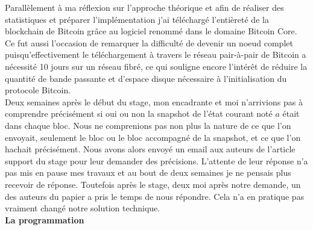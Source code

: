 \documentclass[12pt,a4paper]{article}
\begin{document}
	Parallèlement à ma réflexion sur l'approche théorique et afin de réaliser des statistiques et préparer l'implémentation j'ai téléchargé l'entièreté de la blockchain de Bitcoin grâce au logiciel renommé dans le domaine Bitcoin Core. Ce fut aussi l'occasion de remarquer la difficulté de devenir un noeud complet puisqu'effectivement le téléchargement à travers le réseau pair-à-pair de Bitcoin a nécessité 10 jours sur un réseau fibré, ce qui souligne encore l'intérêt de réduire la quantité de bande passante et d'espace disque nécessaire à l'initialisation du protocole Bitcoin.\\ %
	Deux semaines après le début du stage, mon encadrante et moi n'arrivions pas à comprendre précisément si oui ou non la snapshot de l'état courant noté $a$ était dans chaque bloc. Nous ne comprenions pas non plus la nature de ce que l'on envoyait, seulement le bloc ou le bloc accompagné de la snapshot, et ce que l'on hachait précisément. Nous avons alors envoyé un email aux auteurs de l'article support du stage pour leur demander des précisions. L'attente de leur réponse n'a pas mis en pause mes travaux et au bout de deux semaines je ne pensais plus recevoir de réponse. Toutefois après le stage, deux moi après notre demande, un des auteurs du papier a pris le temps de nous répondre. Cela n'a en pratique pas vraiment changé notre solution technique.\\ %
	
	\textbf{La programmation\\}
	
\end{document}
